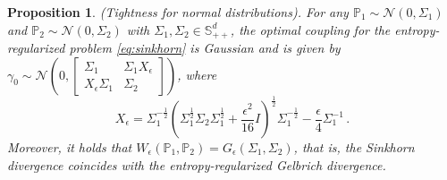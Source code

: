 \documentclass[letterpaper, 10 pt, conference]{ieeeconf}  %
\theoremstyle{ieeeconf}
\newtheorem{proposition}{Proposition}
\newcommand{\Prob}{\mathbb{P}}
\newcommand{\Q}{\mathbb{Q}}
\newcommand{\Symm}{\mathbb{S}}
\begin{document}
\begin{proposition}(Tightness for normal distributions). 
For any \( \mathbb{P}_1 \sim \mathcal{N}(0, \Sigma_1) \) and \( \mathbb{P}_2 \sim \mathcal{N}(0, \Sigma_2) \) with $\Sigma_1, \Sigma_2 \in \Symm_{++}^d$, the optimal coupling for the entropy-regularized problem \eqref{eq:sinkhorn} is Gaussian and is given by
$\gamma_0 \sim \mathcal{N}\left(0, \begin{bmatrix} 
\Sigma_1 & \Sigma_1 X_\epsilon \\
X_\epsilon \Sigma_1 & \Sigma_2
\end{bmatrix} \right)$,
where
\begin{equation*}
    X_\epsilon = \Sigma_1^{-\frac{1}{2}} \left( \Sigma_1^{\frac{1}{2}} \Sigma_2 \Sigma_1^{\frac{1}{2}} + \frac{\epsilon^2}{16} I \right)^{\frac{1}{2}} \Sigma_1^{-\frac{1}{2}} - \frac{\epsilon}{4} \Sigma_1^{-1}\,.
\end{equation*}
Moreover, it holds that $W_{\epsilon}(\mathbb{P}_1, \mathbb{P}_2) = G_\epsilon(\Sigma_1, \Sigma_2)$, that is, the Sinkhorn divergence coincides with the entropy-regularized Gelbrich divergence.
\label{proposition:tightness}
\end{proposition}
\end{document}
